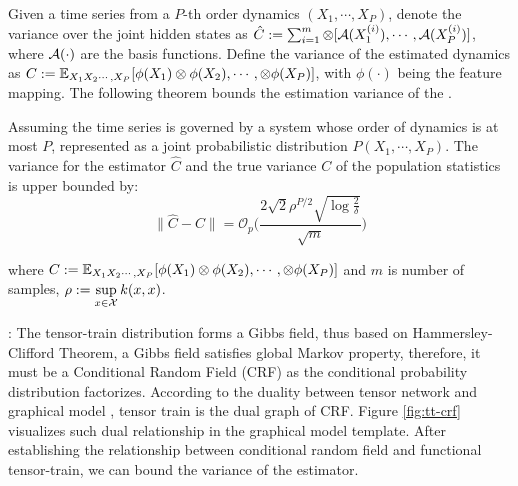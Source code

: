 
Given a time series from a $P$-th order dynamics $(X_1, \cdots, X_P)$,  denote the variance over the joint hidden states as  $\hat{C} := \sum_{i=1}^m \otimes [{\mathcal{A}}(X^{(i)}_1), \cdots ,{\mathcal{A}}(X^{(i)}_P)] $, where ${\mathcal{A}}(\cdot)$ are the basis functions. Define the variance of the estimated dynamics as $C := {\mathbb E}_{X_1 X_2 \cdots,  X_P}[\phi(X_1)\otimes \phi(X_2), \cdots, \otimes \phi(X_P)]$, with $\phi(\cdot)$ being the feature mapping. The following theorem bounds the estimation variance of the \trnn{}. 
\begin{theorem}
Assuming the time series is governed by a system whose order of dynamics is at most $P$, represented as a joint  probabilistic distribution $P(X_1,\cdots, X_P)$.  The variance for the  \trnn{} estimator $\hat{C}$ and the true variance $C$ of  the population statistics is  upper bounded by:
\[   \|\hat{C} - C \| = \mathcal{O}_p \big( \frac{2\sqrt{2} \rho^{P/2}\sqrt{\log \frac{2}{\delta}}}{\sqrt{m}} \big) \]

where $C := {\mathbb E}_{X_1 X_2 \cdots,  X_P}[\phi(X_1)\otimes \phi(X_2), \cdots, \otimes \phi(X_P)]$ and $m$ is number of samples, $\rho:=\sup\limits_{x\in {\mathcal{X}}}k(x,x)$.
\end{theorem}

: 
The tensor-train distribution forms a Gibbs field, thus based on Hammersley-Clifford Theorem, a Gibbs field satisfies global Markov property, therefore, it must be a  Conditional Random Field (CRF) as the  conditional probability distribution factorizes. According to the duality between tensor network and graphical model \cite{robeva2017duality}, tensor train is the dual graph of CRF. Figure \ref{fig:tt-crf} visualizes such dual relationship in the graphical model template. 
%
After establishing the relationship between conditional random field and functional tensor-train, we can bound the variance of the \trnn{} estimator. 


